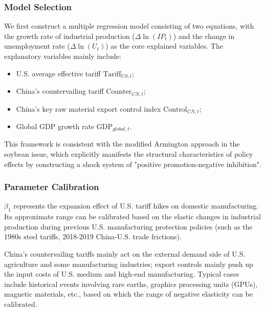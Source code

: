 \documentclass{apmcmthesis}
\begin{document}
\subsubsection{Model Selection}

We first construct a multiple regression model consisting of two equations, with the growth rate of industrial production ($\Delta \ln(IP_t)$) and the change in unemployment rate ($\Delta \ln(U_t)$) as the core explained variables. The explanatory variables mainly include:

\begin{itemize}
    \item U.S. average effective tariff $\text{Tariff}_{US,t}$;
    \item China's countervailing tariff $\text{Counter}_{CN,t}$;
    \item China's key raw material export control index $\text{Control}_{CN,t}$;
    \item Global GDP growth rate $\text{GDP}_{global,t}$.
\end{itemize}

This framework is consistent with the modified Armington approach in the soybean issue, which explicitly manifests the structural characteristics of policy effects by constructing a shock system of "positive promotion-negative inhibition".

\subsubsection{Parameter Calibration}

\item[Impact Intensity of Tariff Shocks on Manufacturing $\beta_1$]

$\beta_1$ represents the expansion effect of U.S. tariff hikes on domestic manufacturing. Its approximate range can be calibrated based on the elastic changes in industrial production during previous U.S. manufacturing protection policies (such as the 1980s steel tariffs, 2018-2019 China-U.S. trade frictions).

\item[Negative Feedback Intensity of Countervailing Tariffs and Export Controls $\beta_2,\beta_3$]

China's countervailing tariffs mainly act on the external demand side of U.S. agriculture and some manufacturing industries; export controls mainly push up the input costs of U.S. medium and high-end manufacturing. Typical cases include historical events involving rare earths, graphics processing units (GPUs), magnetic materials, etc., based on which the range of negative elasticity can be calibrated.
\end{document}
